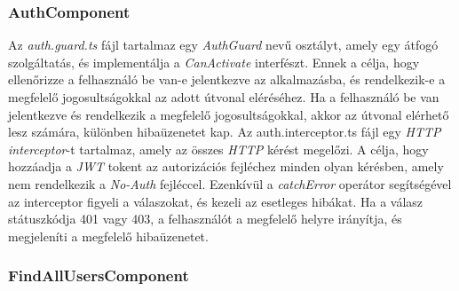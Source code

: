 \subsubsection{AuthComponent}

Az \textit{auth.guard.ts} fájl tartalmaz egy \textit{AuthGuard} nevű osztályt, amely egy átfogó szolgáltatás, és implementálja a \textit{CanActivate} interfészt. Ennek a célja, hogy ellenőrizze a felhasználó be van-e jelentkezve az alkalmazásba, és rendelkezik-e a megfelelő jogosultságokkal az adott útvonal eléréséhez. Ha a felhasználó be van jelentkezve és rendelkezik a megfelelő jogosultságokkal, akkor az útvonal elérhető lesz számára, különben hibaüzenetet kap. Az auth.interceptor.ts fájl egy \textit{HTTP interceptor}-t tartalmaz, amely az összes \textit{HTTP} kérést megelőzi. A célja, hogy hozzáadja a \textit{JWT} tokent az autorizációs fejléchez minden olyan kérésben, amely nem rendelkezik a \textit{No-Auth} fejléccel. Ezenkívül a \textit{catchError} operátor segítségével az interceptor figyeli a válaszokat, és kezeli az esetleges hibákat. Ha a válasz státuszkódja 401 vagy 403, a felhasználót a megfelelő helyre irányítja, és megjeleníti a megfelelő hibaüzenetet.


\subsubsection{FindAllUsersComponent}

